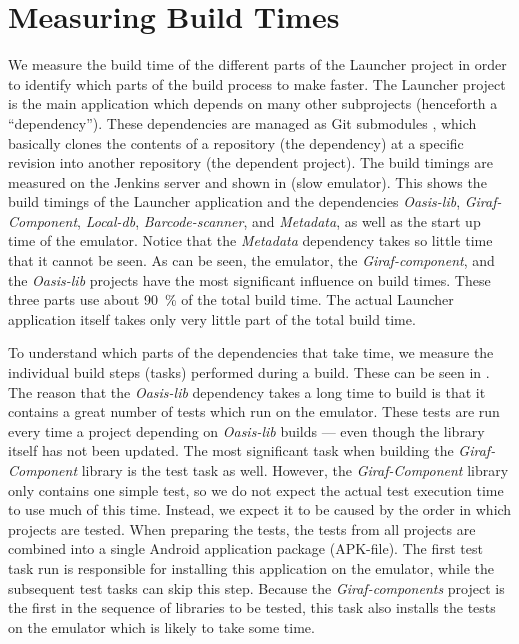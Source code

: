 \section{Measuring Build Times}\label{sec:measuring_build_times}
We measure the build time of the different parts of the Launcher project in order to identify which parts of the build process to make faster. The Launcher project is the main application which depends on many other subprojects (henceforth a ``dependency''). These dependencies are managed as Git submodules \parencite{git-submodules-doc}, which basically clones the contents of a repository (the dependency) at a specific revision into another repository (the dependent project). The build timings are measured on the Jenkins server and shown in  (slow emulator). This shows the build timings of the Launcher application and the dependencies \emph{Oasis-lib}, \emph{Giraf-Component}, \emph{Local-db}, \emph{Barcode-scanner}, and \emph{Metadata}, as well as the start up time of the emulator. Notice that the \emph{Metadata} dependency takes so little time that it cannot be seen. As can be seen, the emulator, the \emph{Giraf-component}, and the \emph{Oasis-lib} projects have the most significant influence on build times. These three parts use about \SI{90}{\percent} of the total build time. The actual Launcher application itself takes only very little part of the total build time.

To understand which parts of the dependencies that take time, we measure the individual build steps (tasks) performed during a build. These can be seen in . The reason that the \emph{Oasis-lib} dependency takes a long time to build is that it contains a great number of tests which run on the emulator. These tests are run every time a project depending on \emph{Oasis-lib} builds --- even though the library itself has not been updated. The most significant task when building the \emph{Giraf-Component} library is the test task as well. However, the \emph{Giraf-Component} library only contains one simple test, so we do not expect the actual test execution time to use much of this time. Instead, we expect it to be caused by the order in which projects are tested. When preparing the tests, the tests from all projects are combined into a single Android application package (APK-file). The first test task run is responsible for installing this application on the emulator, while the subsequent test tasks can skip this step. Because the \emph{Giraf-components} project is the first in the sequence of libraries to be tested, this task also installs the tests on the emulator which is likely to take some time.

